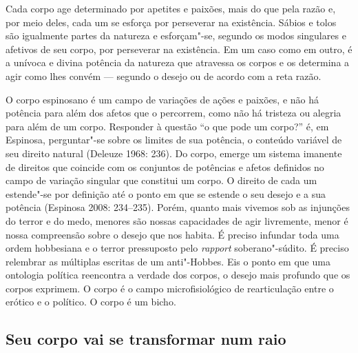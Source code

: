 Cada corpo age determinado por apetites e paixões, mais do que pela
razão e, por meio deles, cada um se esforça por perseverar na
existência. Sábios e tolos são igualmente partes da natureza e
esforçam"-se, segundo os modos singulares e afetivos de seu corpo, por
perseverar na existência. Em um caso como em outro, é a unívoca e divina
potência da natureza que atravessa os corpos e os determina a agir como
lhes convém --- segundo o desejo ou de acordo com a reta razão.

O corpo espinosano é um campo de variações de ações e paixões, e não há
potência para além dos afetos que o percorrem, como não há tristeza ou
alegria para além de um corpo. Responder à questão ``o que pode um
corpo?'' é, em Espinosa, perguntar"-se sobre os limites de sua potência,
o conteúdo variável de seu direito natural (Deleuze 1968: 236). Do
corpo, emerge um sistema imanente de direitos que coincide com os
conjuntos de potências e afetos definidos no campo de variação singular
que constitui um corpo. O direito de cada um estende"-se por definição
até o ponto em que se estende o seu desejo e a sua potência (Espinosa
2008: 234--235). Porém, quanto mais vivemos sob as injunções do terror e
do medo, menores são nossas capacidades de agir livremente, menor é
nossa compreensão sobre o desejo que nos habita. É preciso infundar toda
uma ordem hobbesiana e o terror pressuposto pelo \emph{rapport}
soberano"-súdito. É preciso relembrar as múltiplas escritas de um
anti"-Hobbes. Eis o ponto em que uma ontologia política reencontra a
verdade dos corpos, o desejo mais profundo que os corpos exprimem. O
corpo é o campo microfisiológico de rearticulação entre o erótico e o
político. O corpo é um bicho.

\subsection{Seu corpo vai se transformar num raio}

